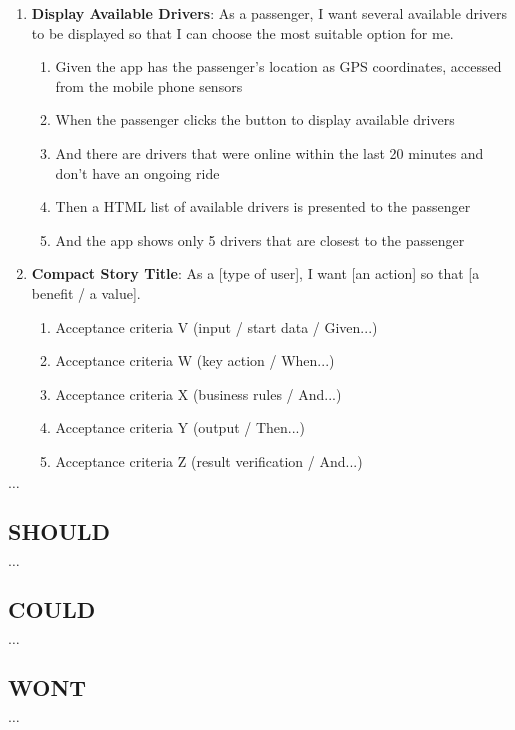 \documentclass[conference,a4paper,flushend]{cs-techrep}
\begin{document}
\begin{enumerate}[{US}1]
	
\item \textbf{Display Available Drivers}: As a passenger, I want several available drivers to be displayed so that I can choose the most suitable option for me.
	\begin{enumerate}
	\item Given the app has the passenger's location as GPS coordinates, accessed from the mobile phone sensors
	\item When the passenger clicks the button to display available drivers
	\item And there are drivers that were online within the last 20 minutes and don’t have an ongoing ride
	\item Then a HTML list of available drivers is presented to the passenger
	\item And the app shows only 5 drivers that are closest to the passenger
	\end{enumerate}

\item \textbf{Compact Story Title}: As a [type of user], I want [an action] so that [a benefit / a value].
	\begin{enumerate}
	\item Acceptance criteria V (input / start data / Given...)
	\item Acceptance criteria W (key action / When...)
	\item Acceptance criteria X (business rules / And...)
	\item Acceptance criteria Y (output / Then...)
	\item Acceptance criteria Z (result verification / And...)
	\end{enumerate}

\end{enumerate}

$\ldots$

\subsection{SHOULD}
$\ldots$
\subsection{COULD}
$\ldots$
\subsection{WONT}
$\ldots$
\end{document}

